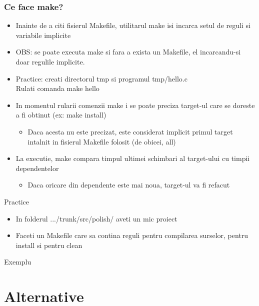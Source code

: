 \documentclass{beamer}
\begin{document}
    \begin{frame}[allowframebreaks]
    \frametitle{Ce face make?}
    \begin{itemize}
    \setlength{\itemsep}{0.6cm}
    \item Inainte de a citi fisierul Makefile, utilitarul make isi incarca setul de reguli si variabile implicite
    \item OBS: se poate executa make si fara a exista un Makefile, el incarcandu-si doar regulile implicite.
    \item Practice: creati directorul {\ttfamily tmp} si programul {\ttfamily tmp/hello.c}\\Rulati comanda {\ttfamily make hello}
    \framebreak
    \item In momentul rularii comenzii make i se poate preciza target-ul care se doreste a fi obtinut (ex: make install)\begin{itemize}\item \vspace{0.6cm}Daca acesta nu este precizat, este considerat implicit primul target intalnit in fisierul Makefile folosit (de obicei, {\ttfamily all}) \end{itemize}
    \item La executie, make compara timpul ultimei schimbari al target-ului cu timpii dependentelor \begin{itemize}\item \vspace{0.6cm}Daca oricare din dependente este mai noua, target-ul va fi refacut \end{itemize}
    \end{itemize}
    \end{frame}

    \begin{frame}{Practice}
    \begin{itemize}
    \setlength{\itemsep}{1cm}
    \item In folderul .../trunk/src/polish/ aveti un mic proiect
    \item Faceti un Makefile care sa contina reguli pentru compilarea surselor, pentru install si pentru clean
    \end{itemize}
    \end{frame}

    \begin{frame}{Exemplu}
    
    \end{frame}

\section{Alternative}
    \frame{\tableofcontents[currentsection]}
    
\end{document}
